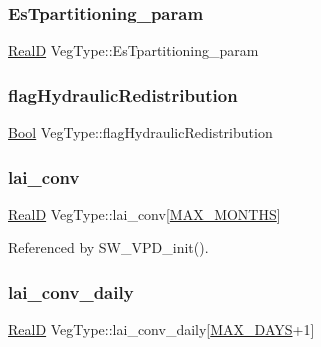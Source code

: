 \subsubsection{\texorpdfstring{Es\+Tpartitioning\+\_\+param}{EsTpartitioning\_param}}
{\footnotesize\ttfamily \hyperlink{generic_8h_af1c105fd5732f70b91ddaeda0cc340e3}{RealD} Veg\+Type\+::\+Es\+Tpartitioning\+\_\+param}

\mbox{\label{struct_veg_type_a83b9fc0e45b383d631fabbe83316fb41}} 
\subsubsection{\texorpdfstring{flag\+Hydraulic\+Redistribution}{flagHydraulicRedistribution}}
{\footnotesize\ttfamily \hyperlink{generic_8h_a39db6982619d623273fad8a383489309}{Bool} Veg\+Type\+::flag\+Hydraulic\+Redistribution}

\mbox{\label{struct_veg_type_a8e5483895a2af8a5f2e1304be81f216b}} 
\subsubsection{\texorpdfstring{lai\+\_\+conv}{lai\_conv}}
{\footnotesize\ttfamily \hyperlink{generic_8h_af1c105fd5732f70b91ddaeda0cc340e3}{RealD} Veg\+Type\+::lai\+\_\+conv\mbox{[}\hyperlink{_times_8h_a9c97e6841188b672e984a4eba7479277}{M\+A\+X\+\_\+\+M\+O\+N\+T\+HS}\mbox{]}}



Referenced by S\+W\+\_\+\+V\+P\+D\+\_\+init().

\mbox{\label{struct_veg_type_a9e4c05e607cbb0ee3ade5b94e1678dcf}} 
\subsubsection{\texorpdfstring{lai\+\_\+conv\+\_\+daily}{lai\_conv\_daily}}
{\footnotesize\ttfamily \hyperlink{generic_8h_af1c105fd5732f70b91ddaeda0cc340e3}{RealD} Veg\+Type\+::lai\+\_\+conv\+\_\+daily\mbox{[}\hyperlink{_times_8h_a01f08d46080872b9f4284873b7f9dee4}{M\+A\+X\+\_\+\+D\+A\+YS}+1\mbox{]}}



